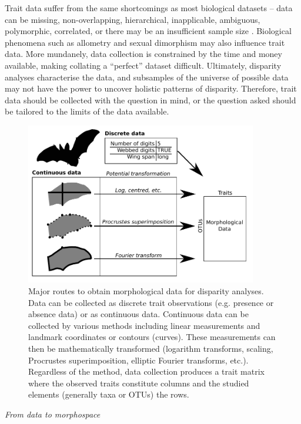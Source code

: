 \documentclass[12pt,letterpaper]{article}
\renewcommand{\subsection}[1]{%
\bigskip
\begin{center}
\begin{large}
\normalfont\itshape #1
\end{large}
\end{center}}
\begin{document}
Trait data suffer from the same shortcomings as most biological datasets -- data can be missing, non-overlapping, hierarchical, inapplicable, ambiguous, polymorphic, correlated, or there may be an insufficient sample size \citep{Brazeau2017-kg, Palci2018-ni}.
Biological phenomena such as allometry and sexual dimorphism may also influence trait data.
More mundanely, data collection is constrained by the time and money available, making collating a ``perfect'' dataset difficult.
Ultimately, disparity analyses characterise the data, and subsamples of the universe of possible data may not have the power to uncover holistic patterns of disparity.
Therefore, trait data should be collected with the question in mind, or the question asked should be tailored to the limits of the data available.

\begin{figure}[!htbp]
\centering
   \includegraphics[width=0.9\textwidth]{Figures/figure_data.pdf}
\caption{
    Major routes to obtain morphological data for disparity analyses. Data can be collected as discrete trait observations (e.g. presence or absence data) or as continuous data.
    Continuous data can be collected by various methods including linear measurements and landmark coordinates or contours (curves).
    These measurements can then be mathematically transformed (logarithm transforms, scaling, Procrustes superimposition, elliptic Fourier transforms, etc.).
    Regardless of the method, data collection produces a trait matrix where the observed traits constitute columns and the studied elements (generally taxa or OTUs) the rows.
}
\label{Fig:data}
\end{figure}


\subsection{From data to morphospace}
\label{section:morphospace}
\end{document}
